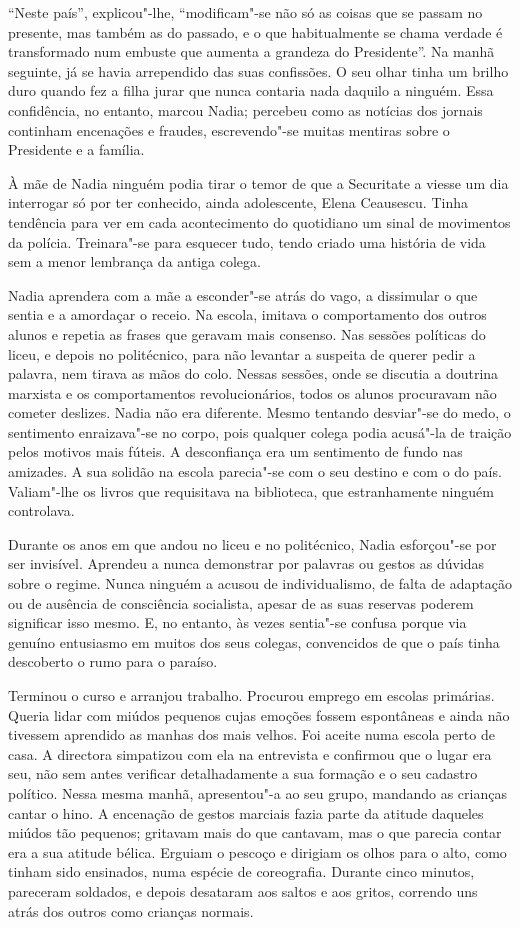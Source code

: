 ``Neste país'', explicou"-lhe, ``modificam"-se não só as coisas que se passam
no presente, mas também as do passado, e o que habitualmente se chama
verdade é transformado num embuste que aumenta a grandeza do
Presidente''. Na manhã seguinte, já se havia arrependido das suas
confissões. O seu olhar tinha um brilho duro quando fez a filha jurar
que nunca contaria nada daquilo a ninguém. Essa confidência, no entanto,
marcou Nadia; percebeu como as notícias dos jornais continham encenações
e fraudes, escrevendo"-se muitas mentiras sobre o Presidente e a
família.

À mãe de Nadia ninguém podia tirar o temor de que a Securitate a viesse
um dia interrogar só por ter conhecido, ainda adolescente, Elena
Ceausescu. Tinha tendência para ver em cada acontecimento do quotidiano
um sinal de movimentos da polícia. Treinara"-se para esquecer tudo, tendo
criado uma história de vida sem a menor lembrança da antiga colega.

Nadia aprendera com a mãe a esconder"-se atrás do vago, a dissimular o
que sentia e a amordaçar o receio. Na
escola, imitava o comportamento dos outros alunos e repetia as frases
que geravam mais consenso. Nas sessões políticas do liceu, e depois no
politécnico, para não levantar a suspeita de querer pedir a palavra,
nem tirava as mãos do colo. Nessas sessões, onde se discutia a doutrina
marxista e os comportamentos revolucionários, todos os alunos procuravam
não cometer deslizes. Nadia não era diferente. Mesmo tentando desviar"-se
do medo, o sentimento enraizava"-se no corpo, pois qualquer colega
podia acusá"-la de traição pelos motivos mais fúteis. A desconfiança
era um sentimento de fundo nas amizades. A sua solidão na escola
parecia"-se com o seu destino e com o do país. Valiam"-lhe os livros que
requisitava na biblioteca, que estranhamente ninguém controlava.

Durante os anos em que andou no liceu e no politécnico, Nadia esforçou"-se por ser invisível. Aprendeu a nunca demonstrar
por palavras ou gestos as dúvidas sobre o regime. Nunca ninguém a acusou
de individualismo, de falta de adaptação ou de ausência de consciência
socialista, apesar de as suas reservas poderem significar isso mesmo. E,
no entanto, às vezes sentia"-se confusa porque via genuíno entusiasmo em
muitos dos seus colegas, convencidos de que o país tinha descoberto o
rumo para o paraíso.

Terminou o curso e arranjou trabalho. Procurou emprego em escolas
primárias. Queria lidar com miúdos pequenos cujas emoções fossem
espontâneas e ainda não tivessem aprendido as manhas dos mais velhos.
Foi aceite numa escola perto de casa. A directora simpatizou com ela na
entrevista e confirmou que o lugar era seu, não sem antes verificar
detalhadamente a sua formação e o seu
cadastro político. Nessa mesma manhã, apresentou"-a ao seu grupo,
mandando as crianças cantar o hino. A encenação de gestos marciais
fazia parte da atitude daqueles miúdos tão pequenos; gritavam mais do
que cantavam, mas o que parecia contar era a sua atitude bélica. Erguiam
o pescoço e dirigiam os olhos para o alto, como tinham sido ensinados,
numa espécie de coreografia. Durante cinco minutos, pareceram soldados,
e depois desataram aos saltos e aos gritos, correndo uns atrás dos
outros como crianças normais.


